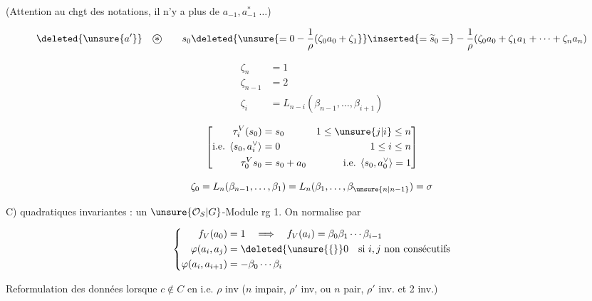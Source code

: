 
(Attention au chgt des notations, il n'y a plus de $a_{-1},a_{-1}^*\ \ldots$)

\[
\deleted{\unsure{a'}}\quad\text{\textcircled{$*$}}\qquad
s_0\deleted{\unsure{=0-\frac1{\rho}(\zeta_0a_0+\zeta_1}}
\inserted{=\widetilde{s}_0=}
-\frac1\rho(\zeta_0a_0+\zeta_1a_1+\cdots+\zeta_n a_n)
\]


\[
\begin{aligned}
\zeta_n&=1\\
\zeta_{n-1}&=2\\
\zeta_i&=L_{n-i}(\beta_{n-1},\ldots,\beta_{i+1})
\end{aligned}
\]

\[
\left[\begin{aligned}
\tau_i^V(s_0)&=s_0 &1\le\unsure{j|i}\le n\\
\text{i.e. }\langle s_0,a_i^\vee\rangle&=0 &1\le i\le n\\
\tau_0^V s_0&=s_0+a_0 &\text{i.e. }\langle s_0,a_0^\vee\rangle=1
\end{aligned}\right]
\]

\[
\zeta_0=L_n(\beta_{n-1},\ldots,\beta_1)=L_n(\beta_1,\ldots,\beta_{\unsure{n|n-1}})=\sigma
\]

C)  quadratiques invariantes :   un  $\unsure{\mathcal O_S|G}$-Module   rg 1. On normalise par

\[
\left\{\begin{aligned}
f_V(a_0)&=1\quad\Longrightarrow\quad f_V(a_i)=\beta_0\beta_1\cdots\beta_{i-1}\\
\varphi(a_i,a_j)&=\deleted{\unsure{\{} }0\quad\text{si } i,j\text{ non consécutifs}\\
\varphi(a_i,a_{i+1})&=-\beta_0\cdots\beta_i
\end{aligned}\right.
\]

Reformulation des données lorsque $c\notin C$ en  i.e. $\rho$ inv ($n$ impair, $\rho'$ inv, ou $n$ pair, $\rho'$ inv. et 2 inv.)


